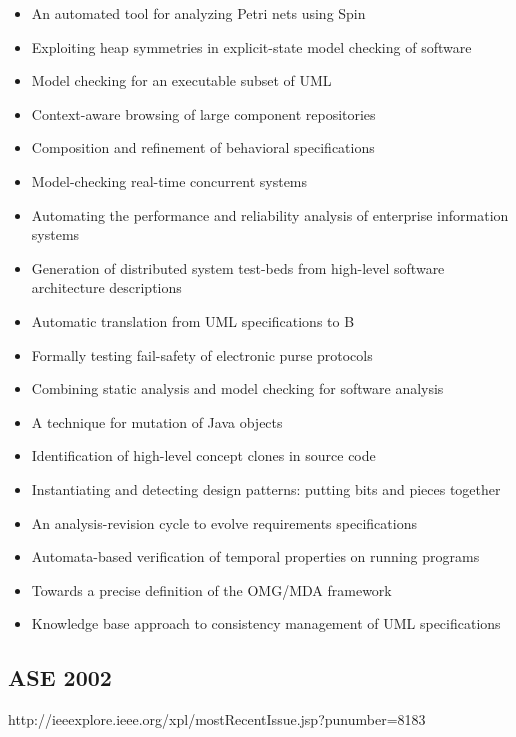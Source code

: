 {\begin{itemize}[itemsep=-1ex]
  \item An automated tool for analyzing Petri nets using Spin
  \item Exploiting heap symmetries in explicit-state model checking of software
  \item Model checking for an executable subset of UML
  \item Context-aware browsing of large component repositories
  \item Composition and refinement of behavioral specifications
  \item Model-checking real-time concurrent systems
  \item Automating the performance and reliability analysis of enterprise information systems
  \item Generation of distributed system test-beds from high-level software architecture descriptions
  \item Automatic translation from UML specifications to B
  \item Formally testing fail-safety of electronic purse protocols
  \item Combining static analysis and model checking for software analysis
  \item A technique for mutation of Java objects
  \item Identification of high-level concept clones in source code
  \item Instantiating and detecting design patterns: putting bits and pieces together
  \item An analysis-revision cycle to evolve requirements specifications
  \item Automata-based verification of temporal properties on running programs
  \item Towards a precise definition of the OMG/MDA framework
  \item Knowledge base approach to consistency management of UML specifications 
\end{itemize}
}

\subsection{ASE 2002}

http://ieeexplore.ieee.org/xpl/mostRecentIssue.jsp?punumber=8183

